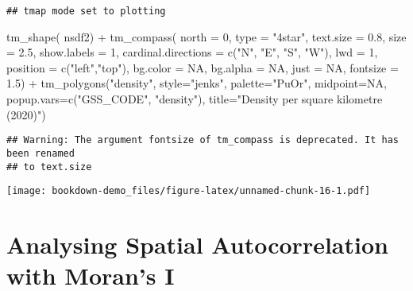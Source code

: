 \documentclass[
]{book}
\newenvironment{Shaded}{\begin{snugshade}}{\end{snugshade}}
\newcommand{\AttributeTok}[1]{\textcolor[rgb]{0.77,0.63,0.00}{#1}}
\newcommand{\ConstantTok}[1]{\textcolor[rgb]{0.00,0.00,0.00}{#1}}
\newcommand{\DecValTok}[1]{\textcolor[rgb]{0.00,0.00,0.81}{#1}}
\newcommand{\FloatTok}[1]{\textcolor[rgb]{0.00,0.00,0.81}{#1}}
\newcommand{\FunctionTok}[1]{\textcolor[rgb]{0.00,0.00,0.00}{#1}}
\newcommand{\NormalTok}[1]{#1}
\newcommand{\SpecialCharTok}[1]{\textcolor[rgb]{0.00,0.00,0.00}{#1}}
\newcommand{\StringTok}[1]{\textcolor[rgb]{0.31,0.60,0.02}{#1}}
\begin{document}
\begin{verbatim}
## tmap mode set to plotting
\end{verbatim}

\begin{Shaded}
\begin{Highlighting}[]
\FunctionTok{tm\_shape}\NormalTok{( nsdf2) }\SpecialCharTok{+}
  \FunctionTok{tm\_compass}\NormalTok{( }\AttributeTok{north =} \DecValTok{0}\NormalTok{,}
              \AttributeTok{type =} \StringTok{"4star"}\NormalTok{,}
              \AttributeTok{text.size =} \FloatTok{0.8}\NormalTok{,}
              \AttributeTok{size =} \FloatTok{2.5}\NormalTok{,}
              \AttributeTok{show.labels =} \DecValTok{1}\NormalTok{,}
              \AttributeTok{cardinal.directions =} \FunctionTok{c}\NormalTok{(}\StringTok{"N"}\NormalTok{, }\StringTok{"E"}\NormalTok{, }\StringTok{"S"}\NormalTok{, }\StringTok{"W"}\NormalTok{),}
              \AttributeTok{lwd =} \DecValTok{1}\NormalTok{,}
              \AttributeTok{position =} \FunctionTok{c}\NormalTok{(}\StringTok{"left"}\NormalTok{,}\StringTok{"top"}\NormalTok{),}
              \AttributeTok{bg.color =} \ConstantTok{NA}\NormalTok{,}
              \AttributeTok{bg.alpha =} \ConstantTok{NA}\NormalTok{,}
              \AttributeTok{just =} \ConstantTok{NA}\NormalTok{,}
              \AttributeTok{fontsize =} \FloatTok{1.5}\NormalTok{) }\SpecialCharTok{+}
  \FunctionTok{tm\_polygons}\NormalTok{(}\StringTok{"density"}\NormalTok{,}
              \AttributeTok{style=}\StringTok{"jenks"}\NormalTok{,}
              \AttributeTok{palette=}\StringTok{"PuOr"}\NormalTok{,}
              \AttributeTok{midpoint=}\ConstantTok{NA}\NormalTok{,}
              \AttributeTok{popup.vars=}\FunctionTok{c}\NormalTok{(}\StringTok{"GSS\_CODE"}\NormalTok{, }\StringTok{"density"}\NormalTok{),}
              \AttributeTok{title=}\StringTok{"Density per square kilometre (2020)"}\NormalTok{)}
\end{Highlighting}
\end{Shaded}

\begin{verbatim}
## Warning: The argument fontsize of tm_compass is deprecated. It has been renamed
## to text.size
\end{verbatim}

\texttt{[image: bookdown-demo\_files/figure-latex/unnamed-chunk-16-1.pdf]}

\hypertarget{analysing-spatial-autocorrelation-with-morans-i}{%
\chapter{Analysing Spatial Autocorrelation with Moran's I}\label{analysing-spatial-autocorrelation-with-morans-i}}
\end{document}
